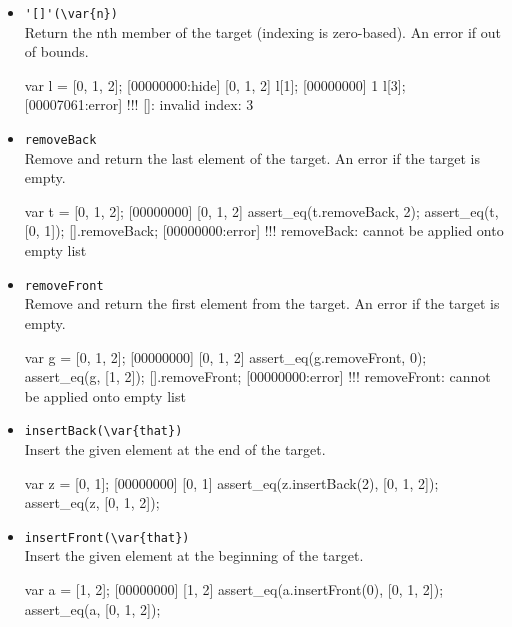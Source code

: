 \begin{itemize}
\item \lstinline|'[]'(\var{n})|\\
\label{sec:std-list-nth}
Return the nth member of the target (indexing is zero-based). An error
if out of bounds.

\begin{urbiscript}[firstnumber=last]
var l = [0, 1, 2];
[00000000:hide] [0, 1, 2]
l[1];
[00000000] 1
l[3];
[00007061:error] !!! []: invalid index: 3
\end{urbiscript}

\item \lstinline|removeBack|\\
Remove and return the last element of the target. An error if the
target is empty.

\begin{urbiscript}[firstnumber=last]
var t = [0, 1, 2];
[00000000] [0, 1, 2]
assert_eq(t.removeBack, 2);
assert_eq(t, [0, 1]);
[].removeBack;
[00000000:error] !!! removeBack: cannot be applied onto empty list
\end{urbiscript}

\item \lstinline|removeFront|\\
Remove and return the first element from the target. An error if the
target is empty.

\begin{urbiscript}[firstnumber=last]
var g = [0, 1, 2];
[00000000] [0, 1, 2]
assert_eq(g.removeFront, 0);
assert_eq(g, [1, 2]);
[].removeFront;
[00000000:error] !!! removeFront: cannot be applied onto empty list
\end{urbiscript}

\item \lstinline|insertBack(\var{that})|\\
\label{sec:std-list-pushback}
Insert the given element at the end of the target.

\begin{urbiscript}[firstnumber=last]
var z = [0, 1];
[00000000] [0, 1]
assert_eq(z.insertBack(2), [0, 1, 2]);
assert_eq(z, [0, 1, 2]);
\end{urbiscript}

\item \lstinline|insertFront(\var{that})|\\
Insert the given element at the beginning of the target.

\begin{urbiscript}[firstnumber=last]
var a = [1, 2];
[00000000] [1, 2]
assert_eq(a.insertFront(0), [0, 1, 2]);
assert_eq(a, [0, 1, 2]);
\end{urbiscript}


\end{itemize}
